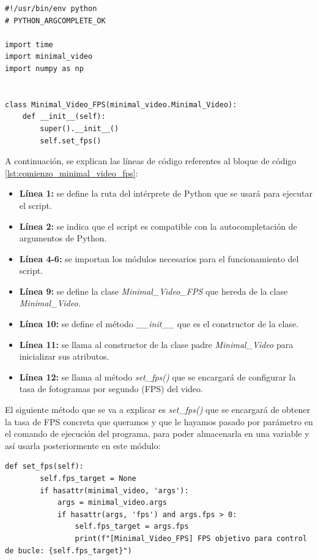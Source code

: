\begin{lstlisting}[style=pythonstyle, caption={Comienzo del módulo Minimal\_Video\_FPS.py y su inicialización}, label={lst:comienzo_minimal_video_fps}]
#!/usr/bin/env python
# PYTHON_ARGCOMPLETE_OK

import time
import minimal_video
import numpy as np


class Minimal_Video_FPS(minimal_video.Minimal_Video):
    def __init__(self):
        super().__init__()
        self.set_fps()

\end{lstlisting}
\vspace{\baselineskip}

A continuación, se explican las líneas de código referentes al bloque de código \ref{lst:comienzo_minimal_video_fps}:
\begin{itemize}
    \item \textbf{Línea 1:} se define la ruta del intérprete de Python que se usará para ejecutar el script.
    \item \textbf{Línea 2:} se indica que el script es compatible con la autocompletación de argumentos de Python.
    \item \textbf{Línea 4-6:} se importan los módulos necesarios para el funcionamiento del script.
    \item \textbf{Línea 9:} se define la clase \textit{Minimal\_Video\_FPS} que hereda de la clase \textit{Minimal\_Video}.
    \item \textbf{Línea 10:} se define el método \textit{\_\_init\_\_} que es el constructor de la clase.
    \item \textbf{Línea 11:} se llama al constructor de la clase padre \textit{Minimal\_Video} para inicializar sus atributos.
    \item \textbf{Línea 12:} se llama al método \textit{set\_fps()} que se encargará de configurar la tasa de fotogramas por segundo (FPS) del video.
\end{itemize}
\vspace{\baselineskip}

El siguiente método que se va a explicar es \textit{set\_fps()} que se encargará de obtener la tasa de FPS concreta que queramos y que le hayamos pasado por parámetro en el comando de ejecución del programa, para poder almacenarla en una variable y así usarla posteriormente en este módulo:
\begin{lstlisting}[style=pythonstyle, caption={Método set\_fps() de \textit{Minimal\_Video\_FPS}}, label={lst:set_fps_minimal_video_fps}]
def set_fps(self):
        self.fps_target = None
        if hasattr(minimal_video, 'args'):
            args = minimal_video.args
            if hasattr(args, 'fps') and args.fps > 0:
                self.fps_target = args.fps
                print(f"[Minimal_Video_FPS] FPS objetivo para control de bucle: {self.fps_target}")
\end{lstlisting}
\vspace{\baselineskip}

